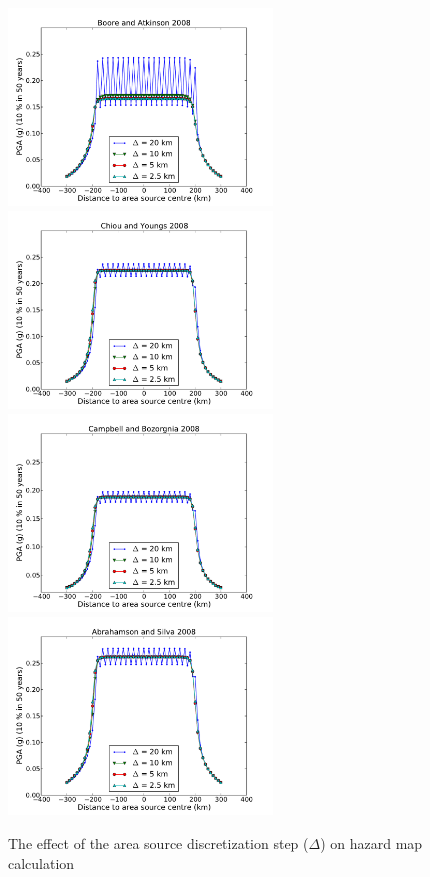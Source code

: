 \begin{figure}
\centering
\includegraphics[width=7cm]{./Pictures/PGA_0pt1_source_model_a5_BA2008.pdf}
\includegraphics[width=7cm]{./Pictures/PGA_0pt1_source_model_a5_CY2008.pdf}
\includegraphics[width=7cm]{./Pictures/PGA_0pt1_source_model_a5_CB2008.pdf}
\includegraphics[width=7cm]{./Pictures/PGA_0pt1_source_model_a5_AS2008.pdf}
\caption{The effect of the area source discretization step ($\Delta$) on hazard map calculation}
\label{fig:delta_area}
\end{figure}

